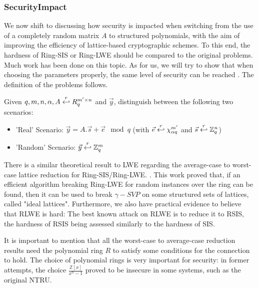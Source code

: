 \subsubsection{SecurityImpact}
\label{sec:securityImpact}
We now shift to discussing how security is impacted when switching from the use of a completely
random matrix $A$ to structured polynomials, with the aim of improving the efficiency of
lattice-based cryptographic schemes. To this end, the hardness of Ring-SIS
or Ring-LWE should be compared to the original problems. Much work has been done on
this topic. As for us, we will try to show that when choosing the parameters properly, the
same level of security can be reached . The definition of the problems follows.
\begin{definition}
   Given
  $q, m, n, \alpha, A \stackrel{r}{\hookleftarrow} {R}_q^{m' \times n}$ and $\vec{y}$,
  distinguish between the following two scenarios:
  \begin{itemize}
  \item 'Real' Scenario: $\vec{y} = A.\vec{s} + \vec{e} \mod q$ (with
    $\vec{e} \stackrel{r}{\hookleftarrow} \chi_{\alpha q}^{m'}$ and
    $\vec{s} \stackrel{r}{\hookleftarrow} \mathbb{Z}_q^n$)
  \item 'Random' Scenario: $\vec{y} \stackrel{r}{\hookleftarrow} \mathbb{Z}_q^m$
  \end{itemize}
\end{definition}
There is a similar theoretical result to LWE regarding the average-case to
worst-case lattice reduction for Ring-SIS/Ring-LWE.
\cite{lyubashevsky2010ideal}. This work proved that, if an efficient
algorithm breaking Ring-LWE for random instances over the ring can be found, then it can be used to break $\gamma-SVP$ on some structured sets of lattices, called "ideal
lattices". Furthermore, we also have practical evidence to believe that RLWE is
hard: The best known attack on RLWE is to reduce it to RSIS, the hardness of
RSIS being assessed similarly to the hardness of SIS.

It is important to mention that all the worst-case to average-case reduction
results need the polynomial ring $R$ to satisfy some conditions for the
connection to hold. The choice of polynomial rings is very important for
security: in former attempts, the choice $\frac{\mathbb{Z}[x]}{x^n - 1}$
proved to be insecure in some systems, such as the original NTRU.

